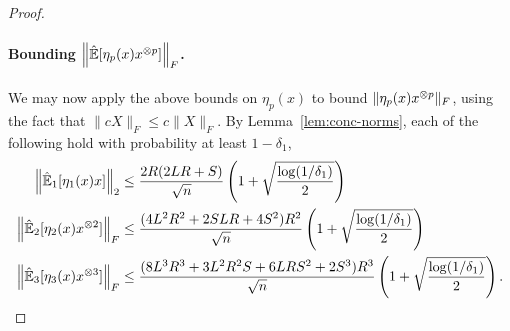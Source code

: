 \documentclass[tablecaption=bottom]{jmlr}
\newcommand\reflem[1]{Lemma~\ref{lem:#1}}
\begin{document}
\begin{proof}
\paragraph{Bounding $\left\| \hat{\operatorname{\mathbb{E}}}[\eta_p(x)x^{\otimes p}] \right\|_F$.}
We may now apply the above bounds on $\eta_p(x)$ to bound $\|\eta_p(x) x^{\otimes p}\|_F$, using the fact that $\|c X\|_F \le c\|X\|_F$.
By \reflem{conc-norms}, each of the following hold with probability at least $1-\delta_1$,
\begin{align*}
    \left\|\hat{\operatorname{\mathbb{E}}}_1[\eta_1(x) x] \right\|_2
      &\le \frac{2R (2LR + S)}{\sqrt{n}} \left( 1 + \sqrt{\frac{\log(1/\delta_1)}{2}} \right) \\
  \left\|\hat{\operatorname{\mathbb{E}}}_2[\eta_2(x) x^{\otimes 2}] \right\|_F
      &\le \frac{(4L^2 R^2 + 2 S L R + 4S^2)R^2}{\sqrt{n}} \left( 1 + \sqrt{\frac{\log(1/\delta_1)}{2}} \right) \\
  \left\|\hat{\operatorname{\mathbb{E}}}_3[\eta_3(x) x^{\otimes 3}] \right\|_F
      &\le \frac{(8L^3 R^3 + 3 L^2 R^2 S + 6 L R S^2 + 2S^3) R^3}{\sqrt{n}} \left( 1 + \sqrt{\frac{\log(1/\delta_1)}{2}} \right).
\end{align*}


\end{proof}
\end{document}
